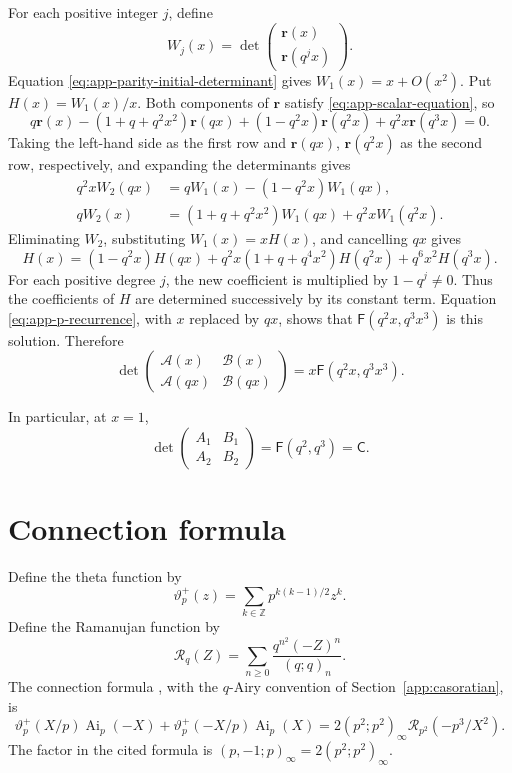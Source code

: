 \documentclass[11pt]{article}
\numberwithin{equation}{section}
\theoremstyle{remark}
\begin{document}
For each positive integer $j$, define
\[
 W_j(x)=\det\begin{pmatrix}\mathbf r(x)\\\mathbf r(q^jx)\end{pmatrix}.
\]
Equation \eqref{eq:app-parity-initial-determinant} gives
\(W_1(x)=x+O(x^2)\). Put \(H(x)=W_1(x)/x\).
Both components of \(\mathbf r\) satisfy \eqref{eq:app-scalar-equation}, so
\[
 q\mathbf r(x)-(1+q+q^2x^2)\mathbf r(qx)
 +(1-q^2x)\mathbf r(q^2x)+q^2x\mathbf r(q^3x)=0.
\]
Taking the left-hand side as the first row and \(\mathbf r(qx)\), \(\mathbf r(q^2x)\)
as the second row, respectively, and expanding the determinants gives
\begin{align*}
 q^2x W_2(qx)&=qW_1(x)-(1-q^2x)W_1(qx),\\
 qW_2(x)&=(1+q+q^2x^2)W_1(qx)+q^2xW_1(q^2x).
\end{align*}
Eliminating \(W_2\), substituting \(W_1(x)=xH(x)\),
and cancelling \(qx\) gives
\begin{equation}\label{eq:app-exterior-equation}
 H(x)=(1-q^2x)H(qx)
 +q^2x(1+q+q^4x^2)H(q^2x)+q^6x^2H(q^3x).
\end{equation}
For each positive degree \(j\), the new coefficient is multiplied
by \(1-q^j\ne0\).  Thus the coefficients of \(H\) are determined successively by its constant term.
Equation \eqref{eq:app-p-recurrence}, with \(x\) replaced by \(qx\),
shows that \(\mathsf F(q^2x,q^3x^3)\) is this solution.  Therefore
\begin{equation}\label{eq:app-Casoratian}
 \det\begin{pmatrix}
 \mathcal A(x)&\mathcal B(x)\\
 \mathcal A(qx)&\mathcal B(qx)
 \end{pmatrix}
 =x\mathsf F(q^2x,q^3x^3).
\end{equation}

In particular, at \(x=1\),
\begin{equation}\label{eq:source-minors}
 \det\begin{pmatrix}A_1&B_1\\A_2&B_2\end{pmatrix}=\mathsf F(q^2,q^3)=\mathsf C.
\end{equation}

\section{Connection formula}
\label{app:Morita}

Define the theta function by
\[
 \vartheta_p^{+}(z)=\sum_{k\in\mathbb Z}p^{k(k-1)/2}z^k.
\]
Define the Ramanujan function by
\[
 \mathcal R_q(Z)=\sum_{n\geq0}\frac{q^{n^2}(-Z)^n}{(q;q)_n}.
\]
The connection formula \cite[Section~1, Theorem]{Morita2011}, with the
\(q\)-Airy convention of Section~\ref{app:casoratian}, is
\begin{equation}\label{eq:app-Morita}
 \vartheta_p^{+}(X/p)\operatorname{Ai}_p(-X)
 +\vartheta_p^{+}(-X/p)\operatorname{Ai}_p(X)
 =2(p^2;p^2)_\infty\mathcal R_{p^2}(-p^3/X^2).
\end{equation}
The factor in the cited formula is
\((p,-1;p)_\infty=2(p^2;p^2)_\infty\).
\end{document}
